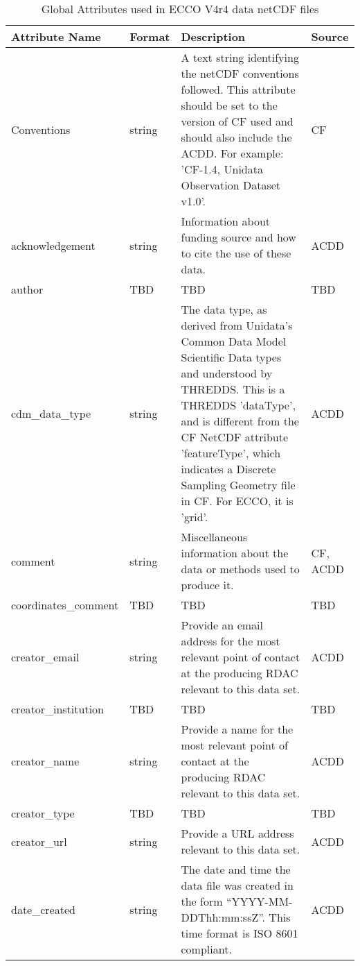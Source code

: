\begin{longtable}{|p{}|p{}|p{}|p{}|}
\caption{Global Attributes used in ECCO V4r4 data netCDF files}
\label{tab:variable-attributes} \\ 
\hline \endhead
\hline \endfoot
\rowcolor{blue!25} \textbf{Attribute Name} & \textbf{Format} & \textbf{Description} & \textbf{Source} \\ \hline
\rowcolor{cyan!25}
Conventions & string & A text string identifying the netCDF conventions followed. This attribute should be set to the version of CF used and should also include the ACDD. For example: 'CF-1.4, Unidata Observation Dataset v1.0'. & CF \\ \hline
\rowcolor{cyan!25}
acknowledgement & string & Information about funding source and how to cite the use of these data. & ACDD \\ \hline
\rowcolor{cyan!25}
author & TBD & TBD & TBD \\ \hline
\rowcolor{cyan!25}
cdm\_data\_type & string & The data type, as derived from Unidata's Common Data Model Scientific Data types and understood by THREDDS. This is a THREDDS 'dataType', and is different from the CF NetCDF attribute 'featureType', which indicates a Discrete Sampling Geometry file in CF. For ECCO, it is 'grid'. & ACDD \\ \hline
\rowcolor{cyan!25}
comment & string & Miscellaneous information about the data or methods used to produce it. & CF, ACDD \\ \hline
\rowcolor{cyan!25}
coordinates\_comment & TBD & TBD & TBD \\ \hline
\rowcolor{cyan!25}
creator\_email & string & Provide an email address for the most relevant point of contact at the producing RDAC relevant to this data set. & ACDD \\ \hline
\rowcolor{cyan!25}
creator\_institution & TBD & TBD & TBD \\ \hline
\rowcolor{cyan!25}
creator\_name & string & Provide a name for the most relevant point of contact at the producing RDAC relevant to this data set. & ACDD \\ \hline
\rowcolor{cyan!25}
creator\_type & TBD & TBD & TBD \\ \hline
\rowcolor{cyan!25}
creator\_url & string & Provide a URL address relevant to this data set. & ACDD \\ \hline
\rowcolor{cyan!25}
date\_created & string & The date and time the data file was created in the form “YYYY-MM-DDThh:mm:ssZ”. This time format is ISO 8601 compliant. & ACDD \\ \hline

\end{longtable}
